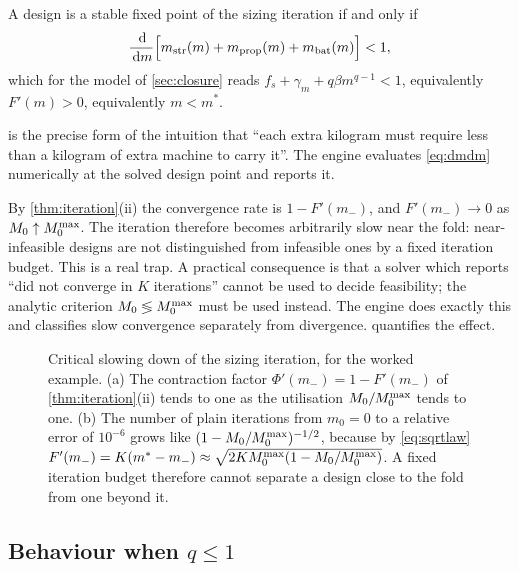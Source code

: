 \begin{corollary}
\label{cor:dmdm}
A design is a stable fixed point of the sizing iteration if and only if
\begin{equation}
  \frac{\,\mathrm{d}}{\,\mathrm{d} m}\Big[m_{\mathrm{str}}(m)+m_{\mathrm{prop}}(m)+m_{\mathrm{bat}}(m)\Big] < 1 ,
  \label{eq:dmdm}
\end{equation}
which for the model of \cref{sec:closure} reads
$f_s + \gamma_m + q\beta m^{q-1} < 1$, equivalently $F'(m)>0$, equivalently
$m<m^*$.
\end{corollary}

 is the precise form of the intuition that ``each extra kilogram
must require less than a kilogram of extra machine to carry it''. The engine
evaluates \cref{eq:dmdm} numerically at the solved design point and reports it.

\begin{remark}
By \cref{thm:iteration}(ii) the convergence rate is $1-F'(m_-)$, and
$F'(m_-)\to 0$ as $M_0\uparrow M_0^{\max}$. The iteration therefore becomes
arbitrarily slow near the fold: near-infeasible designs are not distinguished
from infeasible ones by a fixed iteration budget. This is a real trap. A
practical consequence is that a solver which reports ``did not converge in $K$
iterations'' cannot be used to decide feasibility; the analytic criterion
$M_0 \lessgtr M_0^{\max}$ must be used instead. The engine does exactly this and
classifies slow convergence separately from divergence. 
quantifies the effect.
\end{remark}

\begin{figure}[tbp]
\centering

\caption{Critical slowing down of the sizing iteration, for the worked example.
(a) The contraction factor $\Phi'(m_-)=1-F'(m_-)$ of \cref{thm:iteration}(ii)
tends to one as the utilisation $M_0/M_0^{\max}$ tends to one. (b) The number of
plain iterations from $m_0=0$ to a relative error of $10^{-6}$ grows like
$(1-M_0/M_0^{\max})^{-1/2}$, because by \cref{eq:sqrtlaw}
$F'(m_-)=K(m^*-m_-)\approx\sqrt{2KM_0^{\max}(1-M_0/M_0^{\max})}$. A fixed iteration
budget therefore cannot separate a design close to the fold from one beyond
it.}
\label{fig:slowdown}
\end{figure}

\subsection{Behaviour when \texorpdfstring{$q\le1$}{q <= 1}}

